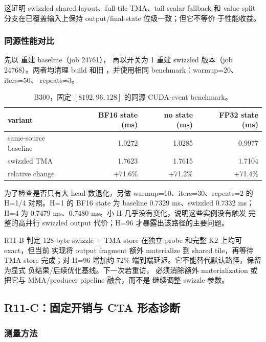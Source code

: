 这证明 swizzled shared layout、full-tile TMA、tail scalar fallback 和
value-split 分支在已覆盖输入上保持 output/final-state 位级一致；但它不等价
于性能收益。

\subsubsection{同源性能对比}

先以  重建 baseline（job 24761），
再以开关为 1 重建 swizzled 版本（job 24768）。两者均清理 build 和旧
，并使用相同 benchmark：warmup=20、iters=50、
repeats=3。

\begin{table}[htbp]
\centering
\small
\begin{tabular}{l r r r}
\toprule
variant & BF16 state (ms) & no state (ms) & FP32 state (ms) \\
\midrule
same-source baseline & 1.0272 & 1.0285 & 0.9977 \\
swizzled TMA & 1.7623 & 1.7615 & 1.7104 \\
\midrule
relative change & +71.6\% & +71.2\% & +71.4\% \\
\bottomrule
\end{tabular}
\caption{B300，固定 \([8192,96,128]\) 的同源 CUDA-event benchmark。}
\end{table}

为了检查是否只有大 head 数退化，另做 warmup=10、iters=30、repeats=2 的
H=1/4 对照。H=1 的 BF16 state 为 baseline 0.7329 ms、swizzled 0.7332 ms；
H=4 为 0.7479 ms、0.7480 ms。小 H 几乎没有变化，说明这些实例没有触发
完整的高并行 swizzled output 代价；H=96 才暴露出该路径的主要问题。

\begin{decision}{R11-B 判定}
128-byte swizzle + TMA store 在独立 probe 和完整 K2 上均可 exact，但当前
实现将 output fragment 额外 materialize 到 shared tile，再等待 TMA store
完成；对 H=96 增加约 72\% 端到端延迟。它不能替代默认路径，保留为显式
 负结果/后续优化基线。下一次若重访，
必须消除额外 materialization 或把它与 MMA/producer pipeline 融合，而不是
继续调整 swizzle 参数。
\end{decision}

\subsection{R11-C：固定开销与 CTA 形态诊断}

\subsubsection{测量方法}

